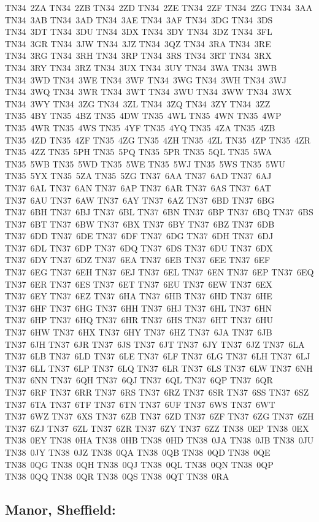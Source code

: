 \documentclass[12pt,a4paper]{article}
\begin{document}
{{TN34~2ZA	TN34~2ZB	TN34~2ZD	TN34~2ZE	TN34~2ZF	TN34~2ZG
TN34~3AA	TN34~3AB	TN34~3AD	TN34~3AE	TN34~3AF	TN34~3DG
TN34~3DS	TN34~3DT	TN34~3DU	TN34~3DX	TN34~3DY	TN34~3DZ
TN34~3FL	TN34~3GR	TN34~3JW	TN34~3JZ	TN34~3QZ	TN34~3RA
TN34~3RE	TN34~3RG	TN34~3RH	TN34~3RP	TN34~3RS	TN34~3RT
TN34~3RX	TN34~3RY	TN34~3RZ	TN34~3UX	TN34~3UY	TN34~3WA
TN34~3WB	TN34~3WD	TN34~3WE	TN34~3WF	TN34~3WG	TN34~3WH
TN34~3WJ	TN34~3WQ	TN34~3WR	TN34~3WT	TN34~3WU	TN34~3WW
TN34~3WX	TN34~3WY	TN34~3ZG	TN34~3ZL	TN34~3ZQ	TN34~3ZY
TN34~3ZZ	TN35~4BY	TN35~4BZ	TN35~4DW	TN35~4WL	TN35~4WN
TN35~4WP	TN35~4WR	TN35~4WS	TN35~4YF	TN35~4YQ	TN35~4ZA
TN35~4ZB	TN35~4ZD	TN35~4ZF	TN35~4ZG	TN35~4ZH	TN35~4ZL
TN35~4ZP	TN35~4ZR	TN35~4ZZ	TN35~5PH	TN35~5PQ	TN35~5PR
TN35~5QL	TN35~5WA	TN35~5WB	TN35~5WD	TN35~5WE	TN35~5WJ
TN35~5WS	TN35~5WU	TN35~5YX	TN35~5ZA	TN35~5ZG	TN37~6AA
TN37~6AD	TN37~6AJ	TN37~6AL	TN37~6AN	TN37~6AP	TN37~6AR
TN37~6AS	TN37~6AT	TN37~6AU	TN37~6AW	TN37~6AY	TN37~6AZ
TN37~6BD	TN37~6BG	TN37~6BH	TN37~6BJ	TN37~6BL	TN37~6BN
TN37~6BP	TN37~6BQ	TN37~6BS	TN37~6BT	TN37~6BW	TN37~6BX
TN37~6BY	TN37~6BZ	TN37~6DB	TN37~6DD	TN37~6DE	TN37~6DF
TN37~6DG	TN37~6DH	TN37~6DJ	TN37~6DL	TN37~6DP	TN37~6DQ
TN37~6DS	TN37~6DU	TN37~6DX	TN37~6DY	TN37~6DZ	TN37~6EA
TN37~6EB	TN37~6EE	TN37~6EF	TN37~6EG	TN37~6EH	TN37~6EJ
TN37~6EL	TN37~6EN	TN37~6EP	TN37~6EQ	TN37~6ER	TN37~6ES
TN37~6ET	TN37~6EU	TN37~6EW	TN37~6EX	TN37~6EY	TN37~6EZ
TN37~6HA	TN37~6HB	TN37~6HD	TN37~6HE	TN37~6HF	TN37~6HG
TN37~6HH	TN37~6HJ	TN37~6HL	TN37~6HN	TN37~6HP	TN37~6HQ
TN37~6HR	TN37~6HS	TN37~6HT	TN37~6HU	TN37~6HW	TN37~6HX
TN37~6HY	TN37~6HZ	TN37~6JA	TN37~6JB	TN37~6JH	TN37~6JR
TN37~6JS	TN37~6JT	TN37~6JY	TN37~6JZ	TN37~6LA	TN37~6LB
TN37~6LD	TN37~6LE	TN37~6LF	TN37~6LG	TN37~6LH	TN37~6LJ
TN37~6LL	TN37~6LP	TN37~6LQ	TN37~6LR	TN37~6LS	TN37~6LW
TN37~6NH	TN37~6NN	TN37~6QH	TN37~6QJ	TN37~6QL	TN37~6QP
TN37~6QR	TN37~6RF	TN37~6RR	TN37~6RS	TN37~6RZ	TN37~6SR
TN37~6SS	TN37~6SZ	TN37~6TA	TN37~6TF	TN37~6TN	TN37~6UF
TN37~6WS	TN37~6WT	TN37~6WZ	TN37~6XS	TN37~6ZB	TN37~6ZD
TN37~6ZF	TN37~6ZG	TN37~6ZH	TN37~6ZJ	TN37~6ZL	TN37~6ZR
TN37~6ZY	TN37~6ZZ	TN38~0EP	TN38~0EX	TN38~0EY	TN38~0HA
TN38~0HB	TN38~0HD	TN38~0JA	TN38~0JB	TN38~0JU	TN38~0JY
TN38~0JZ	TN38~0QA	TN38~0QB	TN38~0QD	TN38~0QE	TN38~0QG
TN38~0QH	TN38~0QJ	TN38~0QL	TN38~0QN	TN38~0QP	TN38~0QQ
TN38~0QR	TN38~0QS	TN38~0QT	TN38~0RA		
}}

\subsection*{Manor, Sheffield:}
\end{document}
